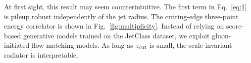 At first sight, this result may seem counterintuitive. The first term in
Eq.~\eqref{eq:1} is pileup robust independently of the jet radius. The
cutting-edge three-point energy correlator is shown in
Fig.~\ref{fig:multiplicity}. Instead of relying on score-based
generative models trained on the JetClass dataset, we exploit
gluon-initiated flow matching models. As long as $z_{\rm cut}$ is small,
the scale-invariant radiator is interpretable.

